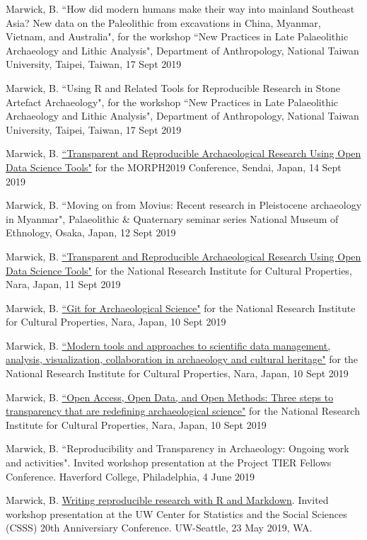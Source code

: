 \ind Marwick, B. ``How did modern humans make their way into mainland Southeast Asia? New data on the Paleolithic from excavations in China, Myanmar, Vietnam, and Australia", for the workshop ``New Practices in Late Palaeolithic Archaeology and Lithic Analysis", Department of Anthropology, National Taiwan University, Taipei, Taiwan, 17 Sept 2019

\ind Marwick, B. ``Using R and Related Tools for Reproducible Research in Stone Artefact Archaeology", for the workshop ``New Practices in Late Palaeolithic Archaeology and Lithic Analysis", Department of Anthropology, National Taiwan University, Taipei, Taiwan, 17 Sept 2019

\ind Marwick, B. \href{https://benmarwick.github.io/2019-09-14-morph2019/}{``Transparent and Reproducible Archaeological Research Using Open Data Science Tools"} for the MORPH2019 Conference, Sendai, Japan, 14 Sept 2019 

\ind Marwick, B.  ``Moving on from Movius: Recent research in Pleistocene archaeology in Myanmar", Palaeolithic \& Quaternary seminar series National Museum of Ethnology, Osaka, Japan, 12 Sept 2019

\ind Marwick, B. \href{https://benmarwick.github.io/2019-09-10-nara/}{``Transparent and Reproducible Archaeological Research Using Open Data Science Tools"} for the National Research Institute for Cultural Properties, Nara, Japan, 11 Sept 2019 

\ind Marwick, B. \href{https://osf.io/dwks9/}{``Git for Archaeological Science"} for the National Research Institute for Cultural Properties, Nara, Japan, 10 Sept 2019 

\ind Marwick, B. \href{https://osf.io/ubvcp/}{``Modern tools and approaches to scientific data management, analysis, visualization, collaboration in archaeology and cultural heritage"} for the National Research Institute for Cultural Properties, Nara, Japan, 10 Sept 2019  

\ind Marwick, B.  \href{https://osf.io/4a6cw/}{``Open Access, Open Data, and Open Methods: Three steps to transparency that are redefining archaeological science"} for the National Research Institute for Cultural Properties, Nara, Japan, 10 Sept 2019 

\ind Marwick, B.  ``Reproducibility and Transparency in Archaeology: Ongoing work and activities". Invited workshop presentation at the Project TIER Fellows Conference. Haverford College, Philadelphia, 4 June 2019

\ind Marwick, B. \href{https://github.com/benmarwick/Marwick-CSSS-May-2019-Reproducibility }{Writing reproducible research with R and Markdown}. Invited workshop presentation at the UW Center for Statistics and the Social Sciences (CSSS) 20th Anniversiary Conference. UW-Seattle, 23 May 2019, WA. 

